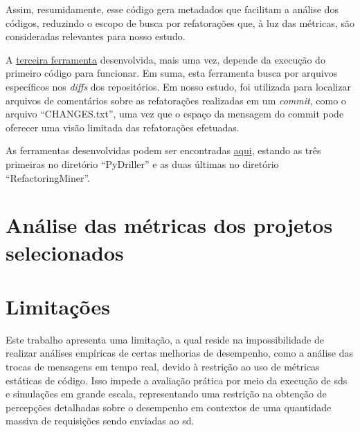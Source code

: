 Assim, resumidamente, esse código gera metadados que facilitam a análise dos códigos, reduzindo o escopo de busca por refatorações que, à luz das métricas, são consideradas relevantes para nosso estudo.

A \href{https://github.com/BrenoFariasdaSilva/Scientific-Research/blob/main/PyDriller/Scripts/track_files.py}{terceira ferramenta} desenvolvida, mais uma vez, depende da execução do primeiro código para funcionar. Em suma, esta ferramenta busca por arquivos específicos nos \textit{diffs} dos repositórios. Em nosso estudo, foi utilizada para localizar arquivos de comentários sobre as refatorações realizadas em um \textit{commit}, como o arquivo ``CHANGES.txt'', uma vez que o espaço da mensagem do commit pode oferecer uma visão limitada das refatorações efetuadas.

As ferramentas desenvolvidas podem ser encontradas \href{https://github.com/BrenoFariasdaSilva/Scientific-Research}{aqui}, estando as três primeiras no diretório ``PyDriller'' e as duas últimas no diretório ``RefactoringMiner''.

\section{Análise das métricas dos projetos selecionados}

\section{Limitações}
\label{sec:limitacoes}

Este trabalho apresenta uma limitação, a qual reside na impossibilidade de realizar análises empíricas de certas melhorias de desempenho, como a análise das trocas de mensagens em tempo real, devido à restrição ao uso de métricas estáticas de código. Isso impede a avaliação prática por meio da execução de \gls{sds} e simulações em grande escala, representando uma restrição na obtenção de percepções detalhadas sobre o desempenho em contextos de uma quantidade massiva de requisições sendo enviadas ao \gls{sd}.